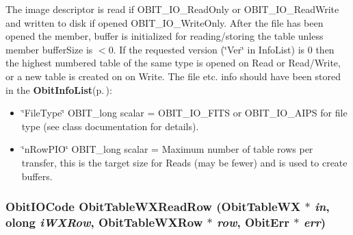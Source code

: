 The image descriptor is read if OBIT\_\-IO\_\-Read\-Only or OBIT\_\-IO\_\-Read\-Write and written to disk if opened OBIT\_\-IO\_\-Write\-Only. After the file has been opened the member, buffer is initialized for reading/storing the table unless member buffer\-Size is $<$0. If the requested version (\char`\"{}Ver\char`\"{} in Info\-List) is 0 then the highest numbered table of the same type is opened on Read or Read/Write, or a new table is created on on Write. The file etc. info should have been stored in the {\bf Obit\-Info\-List}{\rm (p.\,\pageref{structObitInfoList})}: \begin{itemize}
\item \char`\"{}File\-Type\char`\"{} OBIT\_\-long scalar = OBIT\_\-IO\_\-FITS or OBIT\_\-IO\_\-AIPS for file type (see class documentation for details). \item \char`\"{}n\-Row\-PIO\char`\"{} OBIT\_\-long scalar = Maximum number of table rows per transfer, this is the target size for Reads (may be fewer) and is used to create buffers. 
\end{itemize}
\subsubsection{\setlength{\rightskip}{0pt plus 5cm}Obit\-IOCode Obit\-Table\-WXRead\-Row ({\bf Obit\-Table\-WX} $\ast$ {\em in}, {\bf olong} {\em i\-WXRow}, {\bf Obit\-Table\-WXRow} $\ast$ {\em row}, {\bf Obit\-Err} $\ast$ {\em err})}\label{ObitTableWX_8c_a22}


